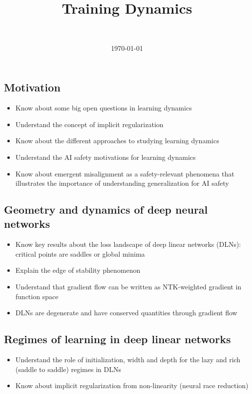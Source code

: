 \documentclass[11pt]{article}
\title{Training Dynamics}
\author{\authorname{Guillaume Corlouer}\\ \affiliation{Stormglass}}
\date{\today}
\begin{document}
\maketitle

\begin{learningoutcomes}
  \subsection*{Motivation}
  \begin{itemize}
    \item Know about some big open questions in learning dynamics
    \item Understand the concept of implicit regularization
    \item Know about the different approaches to studying learning dynamics
    \item Understand the AI safety motivations for learning dynamics
    \item Know about emergent misalignment as a safety-relevant phenomena that illustrates the importance of understanding generalization for AI safety
  \end{itemize}

  \subsection*{Geometry and dynamics of deep neural networks}
  \begin{itemize}
    \item Know key results about the loss landscape of deep linear networks (DLNs): critical points are saddles or global minima
    \item Explain the edge of stability phenomenon
    \item Understand that gradient flow can be written as NTK-weighted gradient in function space
    \item DLNs are degenerate and have conserved quantities through gradient flow
  \end{itemize}

  \subsection*{Regimes of learning in deep linear networks}
  \begin{itemize}
    \item Understand the role of initialization, width and depth for the lazy and rich (saddle to saddle) regimes in DLNs
    \item Know about implicit regularization from non-linearity (neural race reduction)
  \end{itemize}
\end{learningoutcomes}
\end{document}
